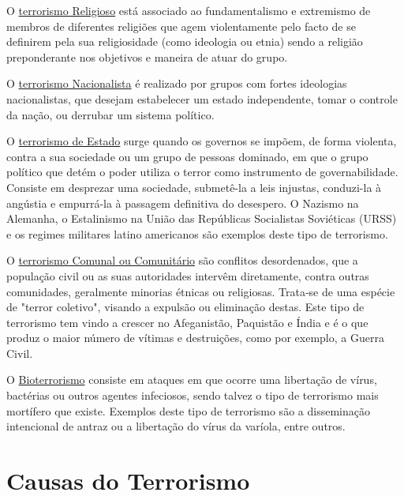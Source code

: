 \documentclass{report}
\begin{document}
O \underline {terrorismo Religioso} está associado ao fundamentalismo e extremismo de membros de diferentes religiões que agem violentamente pelo facto de se definirem pela sua religiosidade (como ideologia ou etnia) sendo a religião preponderante nos objetivos e maneira de atuar do grupo. \par
O \underline {terrorismo Nacionalista} é realizado por grupos com fortes  ideologias nacionalistas, que desejam estabelecer um estado independente, tomar o controle da nação, ou derrubar um sistema político. \par
O \underline{terrorismo de Estado} surge quando os governos se impõem, de forma violenta, contra a sua sociedade ou um grupo de pessoas dominado, em que o grupo político que detém o poder utiliza o terror como instrumento de governabilidade. Consiste em desprezar uma sociedade, submetê-la a leis injustas, conduzi-la à angústia e empurrá-la à passagem definitiva do desespero. O Nazismo na Alemanha, o Estalinismo na União das Repúblicas Socialistas Soviéticas (URSS) e os regimes militares latino americanos são exemplos deste tipo de terrorismo. \par
O \underline {terrorismo Comunal ou Comunitário} são conflitos desordenados, que a população civil ou as suas autoridades intervêm diretamente, contra outras comunidades, geralmente minorias étnicas ou religiosas. Trata‐se de uma espécie de "terror coletivo", visando a expulsão ou eliminação destas. Este tipo de terrorismo tem vindo a crescer no Afeganistão, Paquistão e Índia e é o que produz o maior número de vítimas e destruições, como por exemplo, a Guerra Civil. \par
O \underline{Bioterrorismo} consiste em ataques em que ocorre uma libertação de vírus, bactérias ou outros agentes infeciosos, sendo talvez o tipo de terrorismo mais mortífero que existe. Exemplos deste tipo de terrorismo são a disseminação intencional de antraz ou a libertação do vírus da varíola, entre outros.



\chapter{Causas do Terrorismo}
\label{chap.Causas do Terrorismo}
\end{document}
